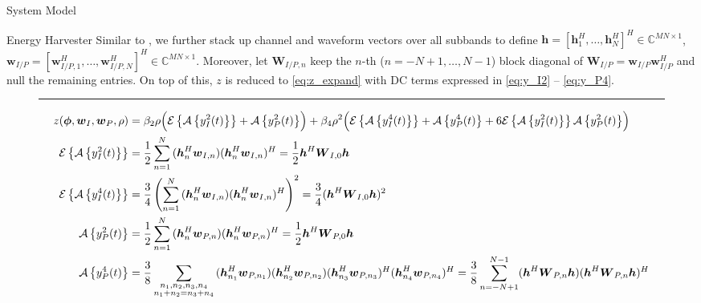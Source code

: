 \documentclass{IEEEtran}
\begin{document}
\begin{section}{System Model}
\begin{subsection}{Energy Harvester}
		Similar to \cite{Huang2017}, we further stack up channel and waveform vectors over all subbands to define $\boldsymbol{h}=[\boldsymbol{h}_1^H,\dots,\boldsymbol{h}_N^H]^H \in \mathbb{C}^{MN \times 1}$, $\boldsymbol{w}_{I/P}=[\boldsymbol{w}_{I/P,1}^H,\dots,\boldsymbol{w}_{I/P,N}^H]^H \in \mathbb{C}^{MN \times 1}$. Moreover, let $\boldsymbol{W}_{I/P,n}$ keep the $n$-th ($n=-N+1,\dots,N-1$) block diagonal of $\boldsymbol{W}_{I/P}=\boldsymbol{w}_{I/P}\boldsymbol{w}_{I/P}^H$ and null the remaining entries. On top of this, $z$ is reduced to \ref{eq:z_expand} with DC terms expressed in \ref{eq:y_I2} -- \ref{eq:y_P4}.
		\begin{figure*}[b]
			\hrule
			\begin{align}
				z(\boldsymbol{\phi},\boldsymbol{w}_I,\boldsymbol{w}_P,\rho)
				& = \beta_2\rho\Bigl(\mathcal{E}\left\{\mathcal{A}\left\{y_{I}^2(t)\right\}\right\}+\mathcal{A}\left\{y_{P}^2(t)\right\}\Bigr)+\beta_4\rho^2\Bigl(\mathcal{E}\left\{\mathcal{A}\left\{y_{I}^4(t)\right\}\right\}+\mathcal{A}\left\{y_{P}^4(t)\right\}+6\mathcal{E}\left\{\mathcal{A}\left\{y_{I}^2(t)\right\}\right\}\mathcal{A}\left\{y_{P}^2(t)\right\}\Bigr)\label{eq:z_expand}\\
				\mathcal{E}\left\{\mathcal{A}\left\{y_{I}^2(t)\right\}\right\}
				& = \frac{1}{2}\sum_{n=1}^N{(\boldsymbol{h}_{n}^H\boldsymbol{w}_{I,n})(\boldsymbol{h}_{n}^H\boldsymbol{w}_{I,n})^H} = \frac{1}{2}\boldsymbol{h}^H\boldsymbol{W}_{I,0}\boldsymbol{h}\label{eq:y_I2}\\
				\mathcal{E}\left\{\mathcal{A}\left\{y_{I}^4(t)\right\}\right\}
				& = \frac{3}{4}\left(\sum_{n=1}^N{(\boldsymbol{h}_{n}^H\boldsymbol{w}_{I,n})(\boldsymbol{h}_{n}^H\boldsymbol{w}_{I,n})^H}\right)^2 = \frac{3}{4}(\boldsymbol{h}^H\boldsymbol{W}_{I,0}\boldsymbol{h})^2\label{eq:y_I4}\\
				\mathcal{A}\left\{y_{P}^2(t)\right\}
				& = \frac{1}{2}\sum_{n=1}^N{(\boldsymbol{h}_{n}^H\boldsymbol{w}_{P,n})(\boldsymbol{h}_{n}^H\boldsymbol{w}_{P,n})^H} = \frac{1}{2}\boldsymbol{h}^H\boldsymbol{W}_{P,0}\boldsymbol{h}\label{eq:y_P2}\\
				\mathcal{A}\left\{y_{P}^4(t)\right\}
				& = \frac{3}{8}\sum_{\substack{{n_1},{n_2},{n_3},{n_4}\\{n_1}+{n_2}={n_3}+{n_4}}}{(\boldsymbol{h}_{{n_1}}^H\boldsymbol{w}_{P,{n_1}})(\boldsymbol{h}_{{n_2}}^H\boldsymbol{w}_{P,{n_2}})(\boldsymbol{h}_{{n_3}}^H\boldsymbol{w}_{P,{n_3}})^H(\boldsymbol{h}_{{n_4}}^H\boldsymbol{w}_{P,{n_4}})^H} = \frac{3}{8}\sum_{n=-N+1}^{N-1}(\boldsymbol{h}^H\boldsymbol{W}_{P,n}\boldsymbol{h})(\boldsymbol{h}^H\boldsymbol{W}_{P,n}\boldsymbol{h})^H\label{eq:y_P4}
			\end{align}
		\end{figure*}
	\end{subsection}


\end{section}
\end{document}
